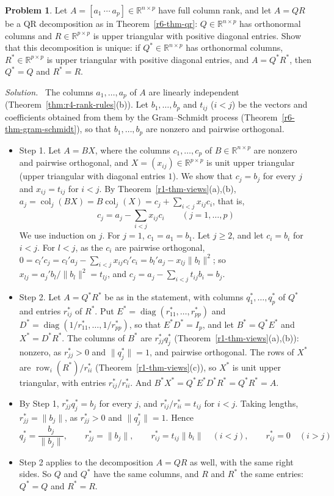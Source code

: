 \documentclass[12pt]{article}
\newcommand{\R}{\mathbb R}
\DeclareMathOperator{\row}{row}
\DeclareMathOperator{\col}{col}
\DeclareMathOperator{\diag}{diag}
\theoremstyle{definition}
\newtheorem{problem}{Problem}
\newenvironment{solution}{\par\noindent\textit{Solution.}\ }{\par\smallskip}
\begin{document}
\begin{problem}\label{r6-pr-qr-unique}
Let \(A=[a_1\ \cdots\ a_p]\in\R^{n\times p}\) have full column rank, and let \(A=QR\) be a QR decomposition as in
Theorem~\ref{r6-thm-qr}: \(Q\in\R^{n\times p}\) has orthonormal columns and \(R\in\R^{p\times p}\) is upper triangular
with positive diagonal entries. Show that this decomposition is unique: if \(Q^*\in\R^{n\times p}\) has orthonormal
columns, \(R^*\in\R^{p\times p}\) is upper triangular with positive diagonal entries, and \(A=Q^*R^*\), then \(Q^*=Q\)
and \(R^*=R\).
\end{problem}
\begin{solution}
The columns \(a_1,\dots,a_p\) of \(A\) are linearly independent (Theorem~\ref{thm:r4-rank-rules}(b)). Let
\(b_1,\dots,b_p\) and \(t_{ij}\) (\(i<j\)) be the vectors and coefficients obtained from them by the Gram--Schmidt
process (Theorem~\ref{r6-thm-gram-schmidt}), so that \(b_1,\dots,b_p\) are nonzero and pairwise orthogonal.
\begin{itemize}
\item Step 1. Let \(A=BX\), where the columns \(c_1,\dots,c_p\) of \(B\in\R^{n\times p}\) are nonzero and pairwise
orthogonal, and \(X=(x_{ij})\in\R^{p\times p}\) is unit upper triangular (upper triangular with diagonal entries
\(1\)). We show that \(c_j=b_j\) for every \(j\) and \(x_{ij}=t_{ij}\) for \(i<j\). By Theorem~\ref{r1-thm-views}(a),(b),
\(a_j=\col_j(BX)=B\col_j(X)=c_j+\sum_{i<j}x_{ij}c_i\), that is,
\[
c_j=a_j-\sum_{i<j}x_{ij}c_i\qquad(j=1,\dots,p)
\]
We use induction on \(j\). For \(j=1\), \(c_1=a_1=b_1\). Let \(j\geqslant2\), and let \(c_i=b_i\) for \(i<j\). For
\(l<j\), as the \(c_i\) are pairwise orthogonal,
\(0=c_l'c_j=c_l'a_j-\sum_{i<j}x_{ij}c_l'c_i=b_l'a_j-x_{lj}\lVert b_l\rVert^2\); so
\(x_{lj}=a_j'b_l/\lVert b_l\rVert^2=t_{lj}\), and \(c_j=a_j-\sum_{i<j}t_{ij}b_i=b_j\).
\item Step 2. Let \(A=Q^*R^*\) be as in the statement, with columns \(q_1^*,\dots,q_p^*\) of \(Q^*\) and entries
\(r_{ij}^*\) of \(R^*\). Put \(E^*=\diag(r_{11}^*,\dots,r_{pp}^*)\) and \(D^*=\diag(1/r_{11}^*,\dots,1/r_{pp}^*)\), so that
\(E^*D^*=I_p\), and let \(B^*=Q^*E^*\) and \(X^*=D^*R^*\). The columns of \(B^*\) are \(r_{jj}^*q_j^*\)
(Theorem~\ref{r1-thm-views}(a),(b)): nonzero, as \(r_{jj}^*>0\) and \(\lVert q_j^*\rVert=1\), and pairwise orthogonal. The
rows of \(X^*\) are \(\row_i(R^*)/r_{ii}^*\) (Theorem~\ref{r1-thm-views}(c)), so \(X^*\) is unit upper triangular, with
entries \(r_{ij}^*/r_{ii}^*\). And \(B^*X^*=Q^*E^*D^*R^*=Q^*R^*=A\).
\item By Step 1, \(r_{jj}^*q_j^*=b_j\) for every \(j\), and \(r_{ij}^*/r_{ii}^*=t_{ij}\) for \(i<j\). Taking lengths,
\(r_{jj}^*=\lVert b_j\rVert\), as \(r_{jj}^*>0\) and \(\lVert q_j^*\rVert=1\). Hence
\[
q_j^*=\frac{b_j}{\lVert b_j\rVert},\qquad r_{jj}^*=\lVert b_j\rVert,\qquad r_{ij}^*=t_{ij}\lVert b_i\rVert\quad(i<j),
\qquad r_{ij}^*=0\quad(i>j)
\]
\item Step 2 applies to the decomposition \(A=QR\) as well, with the same right sides. So \(Q\) and \(Q^*\) have the
same columns, and \(R\) and \(R^*\) the same entries: \(Q^*=Q\) and \(R^*=R\).
\end{itemize}
\end{solution}
\end{document}
